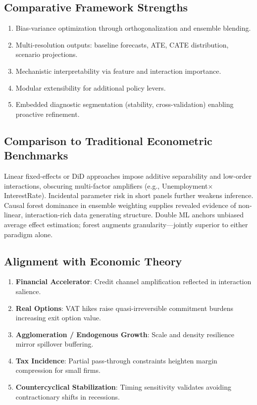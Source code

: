 \subsection{Comparative Framework Strengths}
\begin{enumerate}
  \item Bias-variance optimization through orthogonalization and ensemble blending.
  \item Multi-resolution outputs: baseline forecasts, ATE, CATE distribution, scenario projections.
  \item Mechanistic interpretability via feature and interaction importance.
  \item Modular extensibility for additional policy levers.
  \item Embedded diagnostic segmentation (stability, cross-validation) enabling proactive refinement.
\end{enumerate}

\subsection{Comparison to Traditional Econometric Benchmarks}
Linear fixed-effects or DiD approaches impose additive separability and low-order interactions, obscuring multi-factor amplifiers (e.g., Unemployment$\times$InterestRate). Incidental parameter risk in short panels further weakens inference. Causal forest dominance in ensemble weighting supplies revealed evidence of non-linear, interaction-rich data generating structure. Double ML anchors unbiased average effect estimation; forest augments granularity—jointly superior to either paradigm alone.

\subsection{Alignment with Economic Theory}
\begin{enumerate}
  \item \textbf{Financial Accelerator}: Credit channel amplification reflected in interaction salience.
  \item \textbf{Real Options}: VAT hikes raise quasi-irreversible commitment burdens increasing exit option value.
  \item \textbf{Agglomeration / Endogenous Growth}: Scale and density resilience mirror spillover buffering.
  \item \textbf{Tax Incidence}: Partial pass-through constraints heighten margin compression for small firms.
  \item \textbf{Countercyclical Stabilization}: Timing sensitivity validates avoiding contractionary shifts in recessions.
\end{enumerate}

